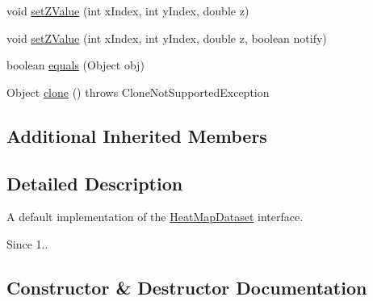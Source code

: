 \begin{DoxyCompactItemize}
void \mbox{\hyperlink{classorg_1_1jfree_1_1data_1_1general_1_1_default_heat_map_dataset_ada1fbb28ef64cba5c3594f4f0e956f38}{set\+Z\+Value}} (int x\+Index, int y\+Index, double z)
\item 
void \mbox{\hyperlink{classorg_1_1jfree_1_1data_1_1general_1_1_default_heat_map_dataset_aa4e5957531f99741664c05e8e1d58400}{set\+Z\+Value}} (int x\+Index, int y\+Index, double z, boolean notify)
\item 
boolean \mbox{\hyperlink{classorg_1_1jfree_1_1data_1_1general_1_1_default_heat_map_dataset_a851d85412051f9498f469714534dc5f5}{equals}} (Object obj)
\item 
Object \mbox{\hyperlink{classorg_1_1jfree_1_1data_1_1general_1_1_default_heat_map_dataset_adc02cf7b7f962506c5a5ac4a56002276}{clone}} ()  throws Clone\+Not\+Supported\+Exception 
\end{DoxyCompactItemize}
\subsection*{Additional Inherited Members}


\subsection{Detailed Description}
A default implementation of the \mbox{\hyperlink{interfaceorg_1_1jfree_1_1data_1_1general_1_1_heat_map_dataset}{Heat\+Map\+Dataset}} interface.

\begin{DoxySince}{Since}
1.. 
\end{DoxySince}


\subsection{Constructor \& Destructor Documentation}
\mbox{\label{classorg_1_1jfree_1_1data_1_1general_1_1_default_heat_map_dataset_ab52fdcc4a2af1809350c2a34f8b00b8d}} 
